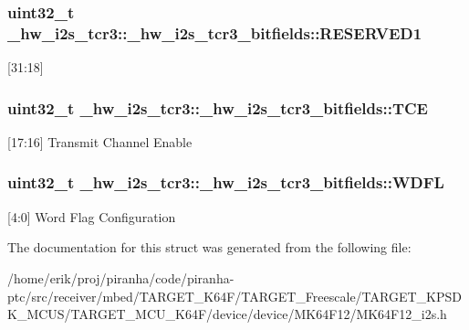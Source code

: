 \subsubsection[{\texorpdfstring{R\+E\+S\+E\+R\+V\+E\+D1}{RESERVED1}}]{\setlength{\rightskip}{0pt plus 5cm}uint32\+\_\+t \+\_\+hw\+\_\+i2s\+\_\+tcr3\+::\+\_\+hw\+\_\+i2s\+\_\+tcr3\+\_\+bitfields\+::\+R\+E\+S\+E\+R\+V\+E\+D1}\hypertarget{struct__hw__i2s__tcr3_1_1__hw__i2s__tcr3__bitfields_a788b6d3ff169d27af08570e702c324e7}{}\label{struct__hw__i2s__tcr3_1_1__hw__i2s__tcr3__bitfields_a788b6d3ff169d27af08570e702c324e7}
\mbox{[}31\+:18\mbox{]} 
\subsubsection[{\texorpdfstring{T\+CE}{TCE}}]{\setlength{\rightskip}{0pt plus 5cm}uint32\+\_\+t \+\_\+hw\+\_\+i2s\+\_\+tcr3\+::\+\_\+hw\+\_\+i2s\+\_\+tcr3\+\_\+bitfields\+::\+T\+CE}\hypertarget{struct__hw__i2s__tcr3_1_1__hw__i2s__tcr3__bitfields_afd4f58c6c4dd22d66f9bfd40510adb8f}{}\label{struct__hw__i2s__tcr3_1_1__hw__i2s__tcr3__bitfields_afd4f58c6c4dd22d66f9bfd40510adb8f}
\mbox{[}17\+:16\mbox{]} Transmit Channel Enable 
\subsubsection[{\texorpdfstring{W\+D\+FL}{WDFL}}]{\setlength{\rightskip}{0pt plus 5cm}uint32\+\_\+t \+\_\+hw\+\_\+i2s\+\_\+tcr3\+::\+\_\+hw\+\_\+i2s\+\_\+tcr3\+\_\+bitfields\+::\+W\+D\+FL}\hypertarget{struct__hw__i2s__tcr3_1_1__hw__i2s__tcr3__bitfields_ae5cf2f5d872f1eacd020e1d1bef67497}{}\label{struct__hw__i2s__tcr3_1_1__hw__i2s__tcr3__bitfields_ae5cf2f5d872f1eacd020e1d1bef67497}
\mbox{[}4\+:0\mbox{]} Word Flag Configuration 

The documentation for this struct was generated from the following file\+:\begin{DoxyCompactItemize}
\item 
/home/erik/proj/piranha/code/piranha-\/ptc/src/receiver/mbed/\+T\+A\+R\+G\+E\+T\+\_\+\+K64\+F/\+T\+A\+R\+G\+E\+T\+\_\+\+Freescale/\+T\+A\+R\+G\+E\+T\+\_\+\+K\+P\+S\+D\+K\+\_\+\+M\+C\+U\+S/\+T\+A\+R\+G\+E\+T\+\_\+\+M\+C\+U\+\_\+\+K64\+F/device/device/\+M\+K64\+F12/M\+K64\+F12\+\_\+i2s.\+h\end{DoxyCompactItemize}
